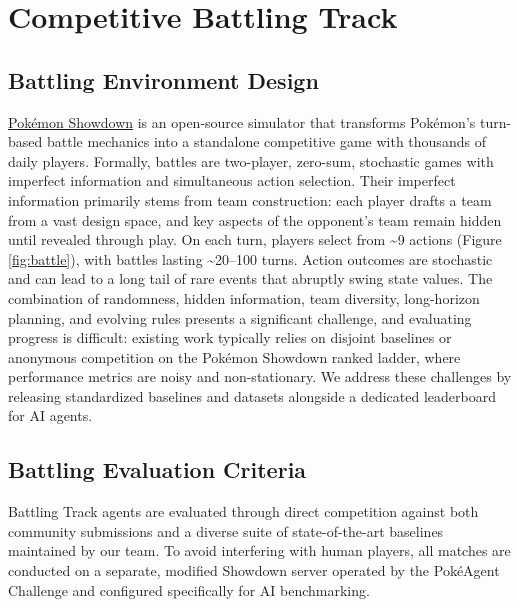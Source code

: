 \section{Competitive Battling Track}

\subsection{Battling Environment Design}
\href{https://play.pokemonshowdown.com}{Pokémon Showdown} is an open-source simulator that transforms Pokémon's turn-based battle mechanics into a standalone competitive game with thousands of daily players. Formally, battles are two-player, zero-sum, stochastic games with imperfect information and simultaneous action selection. Their imperfect information primarily stems from team construction: each player drafts a team from a vast design space, and key aspects of the opponent’s team remain hidden until revealed through play. On each turn, players select from \textasciitilde9 actions (Figure \ref{fig:battle}), with battles lasting \textasciitilde20--100 turns. Action outcomes are stochastic and can lead to a long tail of rare events that abruptly swing state values. The combination of randomness, hidden information, team diversity, long-horizon planning, and evolving rules presents a significant challenge, and evaluating progress is difficult: existing work typically relies on disjoint baselines or anonymous competition on the Pokémon Showdown ranked ladder, where performance metrics are noisy and non-stationary. We address these challenges by releasing standardized baselines and datasets alongside a dedicated leaderboard for AI agents.


\subsection{Battling Evaluation Criteria}
\label{sec:track1:evaluation}

Battling Track agents are evaluated through direct competition against both community submissions and a diverse suite of state-of-the-art baselines maintained by our team. To avoid interfering with human players, all matches are conducted on a separate, modified Showdown server operated by the PokéAgent Challenge and configured specifically for AI benchmarking.


\vspace{-2mm}

